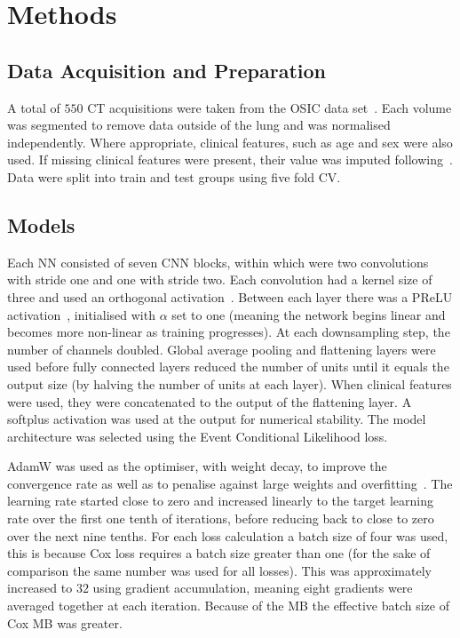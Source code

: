 \vspace{-0.25cm}

\section{Methods} \label{sec:methods}
    \subsection{Data Acquisition and Preparation} \label{sec:data_acquisition_and_preparation}
        A total of $550$ \gls{CT} acquisitions were taken from the \gls{OSIC} data set~\cite{OSICOSICRepository}. Each volume was segmented to remove data outside of the lung and was normalised independently. Where appropriate, clinical features, such as age and sex were also used. If missing clinical features were present, their value was imputed following~\cite{Shahin2022SurvivalData}. Data were split into train and test groups using five fold \gls{CV}.

    \vspace{-0.5cm}

    \subsection{Models} \label{sec:models}
        Each \gls{NN} consisted of seven \gls{CNN} blocks, within which were two convolutions with stride one and one with stride two. Each convolution had a kernel size of three and used an orthogonal activation~\cite{Hu2020ProvableNetworks}. Between each layer there was a \gls{PReLU} activation~\cite{He2015DelvingClassification}, initialised with $\alpha$ set to one (meaning the network begins linear and becomes more non-linear as training progresses). At each downsampling step, the number of channels doubled. Global average pooling and flattening layers were used before fully connected layers reduced the number of units until it equals the output size (by halving the number of units at each layer). When clinical features were used, they were concatenated to the output of the flattening layer. A softplus activation was used at the output for numerical stability. The model architecture was selected using the Event Conditional Likelihood loss.

        AdamW was used as the optimiser, with weight decay, to improve the convergence rate as well as to penalise against large weights and overfitting~\cite{Loshchilov2019DecoupledRegularization}. The learning rate started close to zero and increased linearly to the target learning rate over the first one tenth of iterations, before reducing back to close to zero over the next nine tenths. For each loss calculation a batch size of four was used, this is because Cox loss requires a batch size greater than one (for the sake of comparison the same number was used for all losses). This was approximately increased to $32$ using gradient accumulation, meaning eight gradients were averaged together at each iteration. Because of the \gls{MB} the effective batch size of Cox \gls{MB} was greater.

